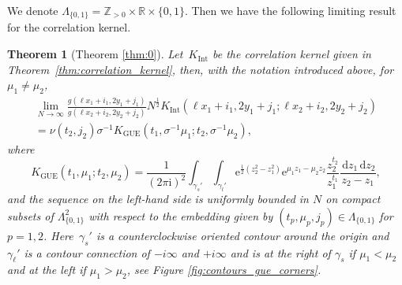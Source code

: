 \documentclass[11pt]{article}
\theoremstyle{plain}
\newtheorem{theorem}{Theorem}[section]
\theoremstyle{definition}
\numberwithin{equation}{section}
\renewcommand{\d}{\,\mathrm{d}}
\renewcommand{\i}{\mathrm{i}}
\newcommand{\e}{\mathrm{e}}
\begin{document}
We denote $\Lambda_{\{0,1\}}= \mathbb{Z}_{>0}\times\mathbb{R}\times\{0,1\}$. Then we have the following limiting result for the correlation kernel.
\begin{theorem}[Theorem \ref{thm:0}]\label{thm:limit_correlation_function}
Let~$K_{\operatorname{Int}}$ be the correlation kernel given in Theorem~\ref{thm:correlation_kernel}, then,  with the notation introduced above,  for $\mu_1\not=\mu_2$, 
\begin{multline}
\lim_{N\to \infty}\frac{g(\ell x_1+i_1,2y_1+j_1)}{g(\ell x_2+i_2,2y_2+j_2)}N^{\frac{1}{2}}K_{\operatorname{Int}}\left(\ell x_1+i_1,2y_1+j_1;\ell x_2+i_2,2y_2+j_2\right) \\
=\nu(t_2,j_2)\sigma^{-1}K_{\operatorname{GUE}}(t_1,\sigma^{-1}\mu_1;t_2,\sigma^{-1}\mu_2),
\end{multline}
where
\begin{equation}\label{eq:kernel_GUE}
K_{\operatorname{GUE}}(t_1,\mu_1;t_2,\mu_2)=\frac{1}{(2\pi\i)^2}\int_{\gamma_s'}\int_{\gamma_l'}\e^{\frac{1}{2}(z_2^2-z_1^2)}\e^{\mu_1 z_1-\mu_2z_2}\frac{z_2^{t_2}}{z_1^{t_1}}\frac{\d z_1\d z_2}{z_2-z_1},
\end{equation}
and the sequence on the left-hand side is uniformly bounded in $N$
 on compact subsets of 
$\Lambda_{\{0,1\}}^2$ with respect to the embedding given by $(t_p, \mu_p, j_p)\in \Lambda_{\{0,1\}}$ for $p=1,2$.
Here~$\gamma_s'$ is a counterclockwise oriented contour around the origin and~$\gamma_{\ell}'$ is a contour connection of $-i\infty$ and $+i\infty$ and 
%
%
 is at the right of $\gamma_s$ if $\mu_1<\mu_2$ and at the left if $\mu_1> \mu_2$, see Figure \ref{fig:contours_gue_corners}. 
 \end{theorem}
 
\end{document}
